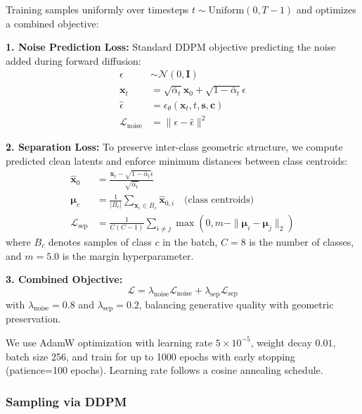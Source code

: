\documentclass[sigconf]{acmart}
\begin{document}
Training samples uniformly over timesteps $t \sim \text{Uniform}(0, T-1)$ and optimizes a combined objective:

\textbf{1. Noise Prediction Loss:} Standard DDPM objective predicting the noise added during forward diffusion:
\begin{align}
\epsilon &\sim \mathcal{N}(0, \mathbf{I}) \\
\mathbf{x}_t &= \sqrt{\bar{\alpha}_t}\mathbf{x}_0 + \sqrt{1-\bar{\alpha}_t}\epsilon \\
\hat{\epsilon} &= \epsilon_\theta(\mathbf{x}_t, t, \mathbf{s}, \mathbf{c}) \\
\mathcal{L}_{\text{noise}} &= \|\epsilon - \hat{\epsilon}\|^2
\end{align}

\textbf{2. Separation Loss:} To preserve inter-class geometric structure, we compute predicted clean latents and enforce minimum distances between class centroids:
\begin{align}
\hat{\mathbf{x}}_0 &= \frac{\mathbf{x}_t - \sqrt{1-\bar{\alpha}_t}\hat{\epsilon}}{\sqrt{\bar{\alpha}_t}} \\
\boldsymbol{\mu}_c &= \frac{1}{|B_c|}\sum_{\mathbf{x}_i \in B_c} \hat{\mathbf{x}}_{0,i} \quad \text{(class centroids)} \\
\mathcal{L}_{\text{sep}} &= \frac{1}{C(C-1)}\sum_{i \neq j} \max(0, m - \|\boldsymbol{\mu}_i - \boldsymbol{\mu}_j\|_2)
\end{align}
where $B_c$ denotes samples of class $c$ in the batch, $C=8$ is the number of classes, and $m=5.0$ is the margin hyperparameter.

\textbf{3. Combined Objective:}
\begin{equation}
\mathcal{L} = \lambda_{\text{noise}} \mathcal{L}_{\text{noise}} + \lambda_{\text{sep}} \mathcal{L}_{\text{sep}}
\end{equation}
with $\lambda_{\text{noise}} = 0.8$ and $\lambda_{\text{sep}} = 0.2$, balancing generative quality with geometric preservation.

We use AdamW optimization with learning rate $5 \times 10^{-5}$, weight decay $0.01$, batch size 256, and train for up to 1000 epochs with early stopping (patience=100 epochs). Learning rate follows a cosine annealing schedule.

\subsubsection{Sampling via DDPM}
\end{document}
